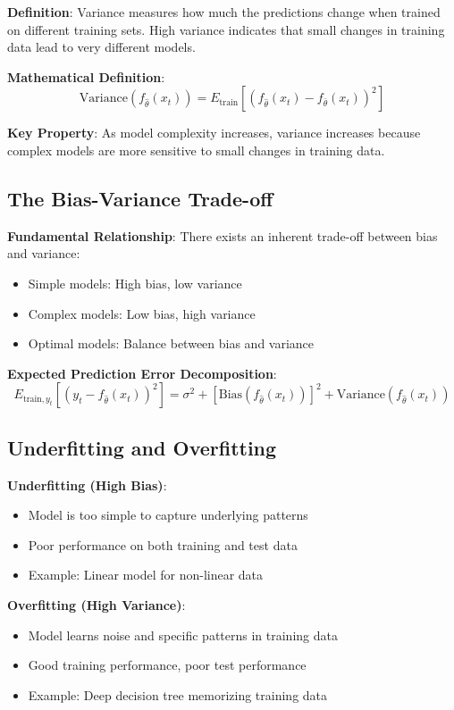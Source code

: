 \documentclass{article}
\begin{document}
\textbf{Definition}: Variance measures how much the predictions change when trained on different training sets. High variance indicates that small changes in training data lead to very different models.

\textbf{Mathematical Definition}:
$$\text{Variance}(f_{\hat{\theta}}(x_t)) = E_{\text{train}}[(f_{\hat{\theta}}(x_t) - f_{\bar{\theta}}(x_t))^2]$$

\textbf{Key Property}: As model complexity increases, variance increases because complex models are more sensitive to small changes in training data.

\subsection{The Bias-Variance Trade-off}

\textbf{Fundamental Relationship}: There exists an inherent trade-off between bias and variance:
\begin{itemize}
    \item Simple models: High bias, low variance
    \item Complex models: Low bias, high variance
    \item Optimal models: Balance between bias and variance
\end{itemize}

\textbf{Expected Prediction Error Decomposition}:
$$E_{\text{train},y_t}[(y_t - f_{\hat{\theta}}(x_t))^2] = \sigma^2 + [\text{Bias}(f_{\hat{\theta}}(x_t))]^2 + \text{Variance}(f_{\hat{\theta}}(x_t))$$

\subsection{Underfitting and Overfitting}

\textbf{Underfitting (High Bias)}:
\begin{itemize}
    \item Model is too simple to capture underlying patterns
    \item Poor performance on both training and test data
    \item Example: Linear model for non-linear data
\end{itemize}

\textbf{Overfitting (High Variance)}:
\begin{itemize}
    \item Model learns noise and specific patterns in training data
    \item Good training performance, poor test performance
    \item Example: Deep decision tree memorizing training data
\end{itemize}
\end{document}
